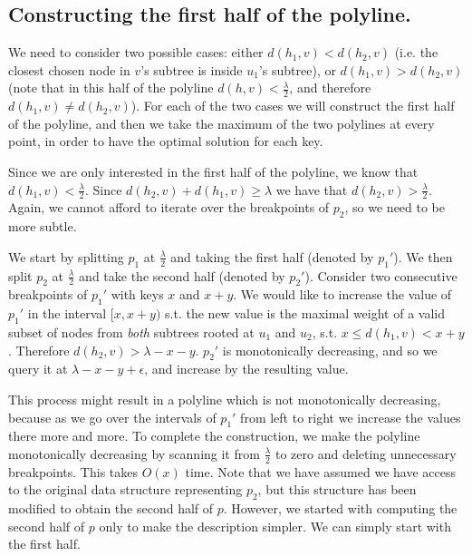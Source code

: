 \documentclass[a4paper,UKenglish]{lipics-v2016}
\theoremstyle{plain}
\begin{document}

\subsection{Constructing the first half of the polyline.} We need to consider two possible cases: either $d(h_1,v) < d(h_2,v)$ (i.e. the closest chosen node in $v$'s subtree is inside $u_1$'s subtree), or $d(h_1,v) > d(h_2,v)$ (note that in this half of the polyline $d(h,v)<\frac{\lambda}{2}$, and therefore $d(h_1,v) \neq d(h_2,v)$). For each of the two cases we will construct the first half of the polyline, and then we take the maximum of the two polylines at every point, in order to have the optimal solution for each key.

\vspace{0.04in}  Since we are only interested in the first half of the polyline, we know that $d(h_1,v) < \frac{\lambda}{2}$. Since $d(h_2,v) +d(h_1,v)\geq \lambda$ we have that  $d(h_2,v) > \frac{\lambda}{2}$. Again, we cannot afford to iterate over the breakpoints of $p_2$, so we need to be more subtle.

We start by splitting $p_1$ at $\frac{\lambda}{2}$ and taking the first half (denoted by $p_1'$). We then split $p_2$ at $\frac{\lambda}{2}$ and take the second half (denoted by $p_2'$). Consider two consecutive breakpoints of $p_1'$ with keys $x$ and $x+y$. We would like to increase the value of $p_1'$ in the interval $[x,x+y)$ s.t. the new value is the maximal weight of a valid subset of nodes from \emph{both} subtrees rooted at $u_1$ and $u_2$, s.t. $x \leq d(h_1,v)<x+y$. Therefore $d(h_2,v)>\lambda-x-y$. $p_2'$ is monotonically decreasing, and so we query it at $\lambda-x-y+\epsilon$, and increase by the resulting value.

This process might result in a polyline which is not monotonically decreasing, because as we go over the intervals of $p_1'$ from left to right we increase the values there more and more.
To complete the construction, we make the polyline monotonically decreasing by scanning it from $\frac{\lambda}{2}$ to zero and deleting unnecessary breakpoints. This takes $O(x)$ time.
%
Note that we have assumed we have access to the original data structure representing $p_{2}$, but this structure has been  modified to obtain the second half of $p$. However, we started with computing the second half of $p$ only to make the description simpler. We can simply start with the first half.
\end{document}
